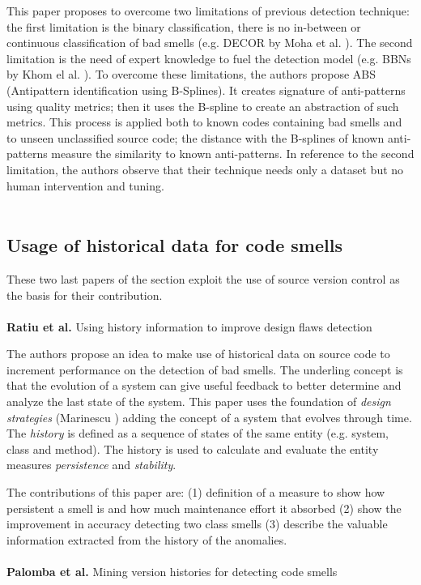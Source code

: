This paper proposes to overcome two limitations of previous detection technique: the first limitation is the binary classification, there is no in-between or continuous classification of bad smells (e.g. DECOR by Moha et al. \cite{moha2009decor}).
The second limitation is the need of expert knowledge to fuel the detection model (e.g. BBNs by Khom el al. \cite{khomh2009bayesian}).
To overcome these limitations, the authors propose ABS (Antipattern identification using B-Splines). It creates signature of anti-patterns using quality metrics; then it uses the B-spline to create an abstraction of such metrics. This process is applied both to known codes containing bad smells and to unseen unclassified source code; the distance with the B-splines of known anti-patterns measure the similarity to known anti-patterns.
In reference to the second limitation, the authors observe that their technique needs only a dataset but no human intervention and tuning.
\\
\\
\subsection{Usage of historical data for code smells } 
These two last papers of the section exploit the use of source version control as the basis for their contribution.
\\
\\
\textbf{Ratiu et al.} \cite{rapu2004using} Using history information to improve design flaws detection

The authors propose an idea to make use of historical data on source code to increment performance on the detection of bad smells.
The underling concept is that the evolution of a system can give useful feedback to better determine and analyze the last state of the system.
This paper uses the foundation of \emph{design strategies} (Marinescu \cite{marinescu2004detection}) adding the concept of a system that evolves through time.
The \emph{history} is defined as a sequence of states of the same entity (e.g. system, class and method). The history is used to calculate and evaluate the entity measures \emph{persistence} and \emph{stability}.

The contributions of this paper are: (1) definition of a measure to show how persistent a smell is and how much maintenance effort it absorbed (2) show the improvement in accuracy detecting two class smells (3) describe the valuable information extracted from the history of the anomalies.
\\
\\
\textbf{Palomba et al.} \cite{palomba2014mining} Mining version histories for detecting code smells

